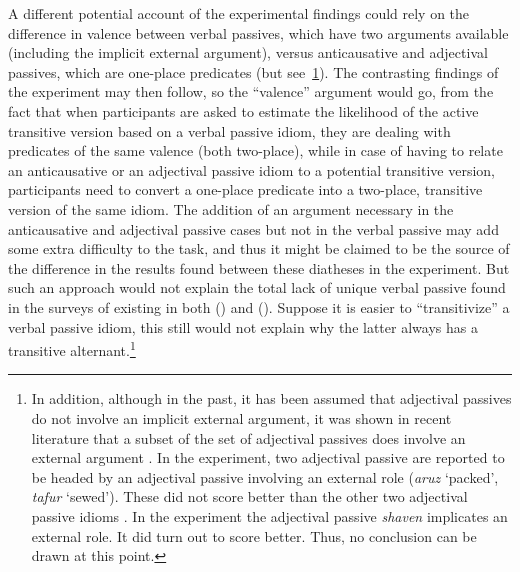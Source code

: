 \documentclass[output=paper]{langsci/langscibook}
\begin{document}
\largerpage[-5]
A different potential account of the experimental findings could rely on the
difference in valence between verbal passives, which have two arguments
available (including the implicit external argument), versus anticausative and
adjectival passives, which are one-place predicates (but see~\cref{fn:20.16}). The
contrasting findings of the experiment may then follow, so the ``valence''
argument would go, from the fact that when participants are asked to estimate
the likelihood of the active transitive version based on a verbal passive
idiom, they are dealing with predicates of the same valence (both two-place),
while in case of having to relate an anticausative or an adjectival passive
idiom to a potential transitive version, participants need to convert a
one-place predicate into a two-place, transitive version of the same idiom. The
addition of an argument necessary in the anticausative and adjectival passive
cases but not in the verbal passive may add some extra difficulty to the task,
and thus it might be claimed to be the source of the difference in the results
found between these diatheses in the experiment. But such an approach would not
explain the total lack of unique verbal passive  found in the surveys of
existing  in both  () and 
(\citealt{HorSil2009}). Suppose it is easier to “transitivize” a verbal passive
idiom, this still would not explain why the latter always has a transitive
alternant.\footnote{In addition, although in the past, it has been assumed that
    adjectival passives do not involve an implicit external argument, it was
    shown in recent literature that a subset of the set of adjectival passives
    does involve an external argument
    \parencite{Anagnostopoulou2003,GehMar2014,McIntyre2013,Meltzer-Asscher2011}.
    In the  experiment, two adjectival passive  are reported
    to be headed by an adjectival passive involving an external role
    (\emph{aruz} ‘packed’, \emph{tafur} ‘sewed’). These  did not
        score better than the other two adjectival passive idioms
        \parencite{SilHorKluWex2018}. In the  experiment the adjectival
passive \emph{shaven} implicates an external role. It did turn out to score
better. Thus, no conclusion can be drawn at this point.\label{fn:20.16}}
\end{document}
